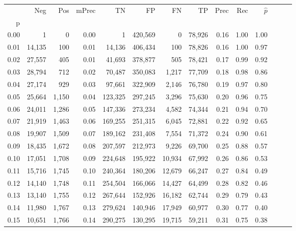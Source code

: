 \begin{tabular}{rrrrrrrrrrrrrr}
\toprule
{} &     Neg &    Pos & mPrec &       TN &       FP &      FN &      TP &  Prec &   Rec & $\hat{p}$ \\
p    &         &        &       &          &          &         &         &       &       &           \\
\midrule
0.00 &       1 &      0 &  0.00 &        1 &  420,569 &       0 &  78,926 &  0.16 &  1.00 &      1.00 \\
0.01 &  14,135 &    100 &  0.01 &   14,136 &  406,434 &     100 &  78,826 &  0.16 &  1.00 &      0.97 \\
0.02 &  27,557 &    405 &  0.01 &   41,693 &  378,877 &     505 &  78,421 &  0.17 &  0.99 &      0.92 \\
0.03 &  28,794 &    712 &  0.02 &   70,487 &  350,083 &   1,217 &  77,709 &  0.18 &  0.98 &      0.86 \\
0.04 &  27,174 &    929 &  0.03 &   97,661 &  322,909 &   2,146 &  76,780 &  0.19 &  0.97 &      0.80 \\
0.05 &  25,664 &  1,150 &  0.04 &  123,325 &  297,245 &   3,296 &  75,630 &  0.20 &  0.96 &      0.75 \\
0.06 &  24,011 &  1,286 &  0.05 &  147,336 &  273,234 &   4,582 &  74,344 &  0.21 &  0.94 &      0.70 \\
0.07 &  21,919 &  1,463 &  0.06 &  169,255 &  251,315 &   6,045 &  72,881 &  0.22 &  0.92 &      0.65 \\
0.08 &  19,907 &  1,509 &  0.07 &  189,162 &  231,408 &   7,554 &  71,372 &  0.24 &  0.90 &      0.61 \\
0.09 &  18,435 &  1,672 &  0.08 &  207,597 &  212,973 &   9,226 &  69,700 &  0.25 &  0.88 &      0.57 \\
0.10 &  17,051 &  1,708 &  0.09 &  224,648 &  195,922 &  10,934 &  67,992 &  0.26 &  0.86 &      0.53 \\
0.11 &  15,716 &  1,745 &  0.10 &  240,364 &  180,206 &  12,679 &  66,247 &  0.27 &  0.84 &      0.49 \\
0.12 &  14,140 &  1,748 &  0.11 &  254,504 &  166,066 &  14,427 &  64,499 &  0.28 &  0.82 &      0.46 \\
0.13 &  13,140 &  1,755 &  0.12 &  267,644 &  152,926 &  16,182 &  62,744 &  0.29 &  0.79 &      0.43 \\
0.14 &  11,980 &  1,767 &  0.13 &  279,624 &  140,946 &  17,949 &  60,977 &  0.30 &  0.77 &      0.40 \\
0.15 &  10,651 &  1,766 &  0.14 &  290,275 &  130,295 &  19,715 &  59,211 &  0.31 &  0.75 &      0.38 \\

\end{tabular}
